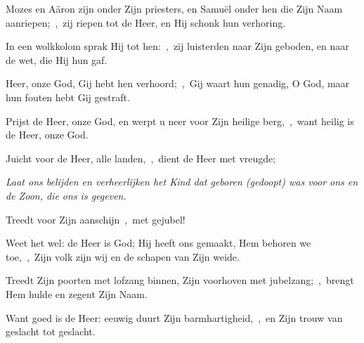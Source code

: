 \documentclass[12pt,twoside,a5paper]{article}
\begin{document}

\begin{halfparskip}
  Mozes en Aäron zijn onder Zijn priesters, en Samuël onder hen die Zijn Naam aanriepen;~\sep\ zij riepen tot de Heer, en Hij schonk hun verhoring.

  In een wolkkolom sprak Hij tot hen:~\sep\ zij luisterden naar Zijn geboden, en naar de wet, die Hij hun gaf.

  Heer, onze God, Gij hebt hen verhoord;~\sep\ Gij waart hun genadig, O God, maar hun fouten hebt Gij gestraft.

  Prijst de Heer, onze God, en werpt u neer voor Zijn heilige berg,~\sep\ want heilig is de Heer, onze God.
\end{halfparskip}


\begin{halfparskip}
  Juicht voor de Heer, alle landen,~\sep\ dient de Heer met vreugde;


   \emph{Laat ons belijden en verheerlijken het Kind dat geboren (gedoopt) was voor ons en de Zoon, die ons is gegeven.}

  Treedt voor Zijn aanschijn~\sep\ met gejubel!

  Weet het wel: de Heer is God; Hij heeft ons gemaakt, Hem behoren we toe,~\sep\ Zijn volk zijn wij en de schapen van Zijn weide.

  Treedt Zijn poorten met lofzang binnen, Zijn voorhoven met jubelzang;~\sep\ brengt Hem hulde en zegent Zijn Naam.

  Want goed is de Heer: eeuwig duurt Zijn barmhartigheid,~\sep\ en Zijn trouw van geslacht tot geslacht.
\end{halfparskip}

\end{document}
